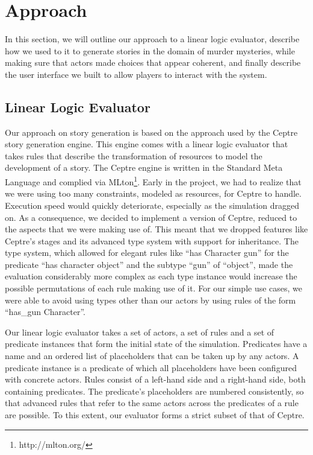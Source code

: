 \section{Approach} \label{approach}

In this section, we will outline our approach to a linear logic evaluator, describe how we used to it to generate stories in the domain of murder mysteries, while making sure that actors made choices that appear coherent, and finally describe the user interface we built to allow players to interact with the system.

\subsection{Linear Logic Evaluator}\label{own_linear_logic_evaluator}

Our approach on story generation is based on the approach used by the Ceptre story generation engine.
This engine comes with a linear logic evaluator that takes rules that describe the transformation of resources to model the development of a story.
The Ceptre engine is written in the Standard Meta Language and complied via MLton\footnote{http://mlton.org/}.
Early in the project, we had to realize that we were using too many constraints, modeled as resources, for Ceptre to handle.
Execution speed would quickly deteriorate, especially as the simulation dragged on.
As a consequence, we decided to implement a version of Ceptre, reduced to the aspects that we were making use of.
This meant that we dropped features like Ceptre's stages and its advanced type system with support for inheritance.
The type system, which allowed for elegant rules like \enquote{has Character gun} for the predicate \enquote{has character object} and the subtype \enquote{gun} of \enquote{object}, made the evaluation considerably more complex as each type instance would increase the possible permutations of each rule making use of it.
For our simple use cases, we were able to avoid using types other than our actors by using rules of the form \enquote{has\_gun Character}.

Our linear logic evaluator takes a set of actors, a set of rules and a set of predicate instances that form the initial state of the simulation.
Predicates have a name and an ordered list of placeholders that can be taken up by any actors.
A predicate instance is a predicate of which all placeholders have been configured with concrete actors.
Rules consist of a left-hand side and a right-hand side, both containing predicates.
The predicate's placeholders are numbered consistently, so that advanced rules that refer to the same actors across the predicates of a rule are possible.
To this extent, our evaluator forms a strict subset of that of Ceptre. 

